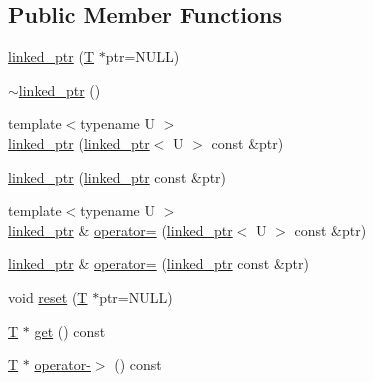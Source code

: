 \subsection*{Public Member Functions}
\begin{DoxyCompactItemize}
\item 
\hyperlink{classtesting_1_1internal_1_1linked__ptr_ae805418b9f03f14ff49649e710475dba}{linked\+\_\+ptr} (\hyperlink{functions__7_8js_adf1f3edb9115acb0a1e04209b7a9937b}{T} $\ast$ptr=N\+U\+LL)
\item 
\hyperlink{classtesting_1_1internal_1_1linked__ptr_af99460fd09ca0f83e061ea480ef1a45e}{$\sim$linked\+\_\+ptr} ()
\item 
{\footnotesize template$<$typename U $>$ }\\\hyperlink{classtesting_1_1internal_1_1linked__ptr_a7597ed91006edd0467c99bd1aaab07f5}{linked\+\_\+ptr} (\hyperlink{classtesting_1_1internal_1_1linked__ptr}{linked\+\_\+ptr}$<$ U $>$ const \&ptr)
\item 
\hyperlink{classtesting_1_1internal_1_1linked__ptr_abc076b5678cc7f64306d5ecfefc93aff}{linked\+\_\+ptr} (\hyperlink{classtesting_1_1internal_1_1linked__ptr}{linked\+\_\+ptr} const \&ptr)
\item 
{\footnotesize template$<$typename U $>$ }\\\hyperlink{classtesting_1_1internal_1_1linked__ptr}{linked\+\_\+ptr} \& \hyperlink{classtesting_1_1internal_1_1linked__ptr_a82608d98869b750d9ab729f1450a9a45}{operator=} (\hyperlink{classtesting_1_1internal_1_1linked__ptr}{linked\+\_\+ptr}$<$ U $>$ const \&ptr)
\item 
\hyperlink{classtesting_1_1internal_1_1linked__ptr}{linked\+\_\+ptr} \& \hyperlink{classtesting_1_1internal_1_1linked__ptr_a1f40b5e66e6cf7b661ea116c806f952e}{operator=} (\hyperlink{classtesting_1_1internal_1_1linked__ptr}{linked\+\_\+ptr} const \&ptr)
\item 
void \hyperlink{classtesting_1_1internal_1_1linked__ptr_a95ba3b7b66ed0193c779976c6e126ab6}{reset} (\hyperlink{functions__7_8js_adf1f3edb9115acb0a1e04209b7a9937b}{T} $\ast$ptr=N\+U\+LL)
\item 
\hyperlink{functions__7_8js_adf1f3edb9115acb0a1e04209b7a9937b}{T} $\ast$ \hyperlink{classtesting_1_1internal_1_1linked__ptr_a6ea8584d9bcad13c3266834f5ce5e771}{get} () const 
\item 
\hyperlink{functions__7_8js_adf1f3edb9115acb0a1e04209b7a9937b}{T} $\ast$ \hyperlink{classtesting_1_1internal_1_1linked__ptr_aa878c3e874242fb3cd2aa14ec603aa25}{operator-\/$>$} () const 
\item 

\end{DoxyCompactItemize}
